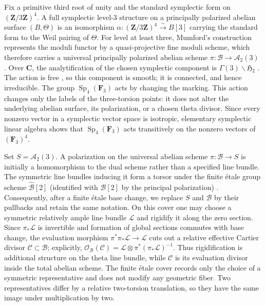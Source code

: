 \documentclass[12pt]{amsart}
\numberwithin{equation}{section}
\theoremstyle{definition}
\theoremstyle{remark}
\newcommand{\C}{\mathbf C}
\newcommand{\Z}{\mathbf Z}
\newcommand{\cO}{\mathcal O}
\begin{document}
Fix a primitive third root of unity and the standard symplectic form on
$(\Z/3\Z)^4$.  A full symplectic level-$3$ structure on a principally
polarized abelian surface $(B,\Theta)$ is an isomorphism
$\alpha:(\Z/3\Z)^4\xrightarrow{\sim}B[3]$ carrying the standard form to
the Weil pairing of $\Theta$.  For level at least three, Mumford's
construction represents the moduli functor by a quasi-projective fine
moduli scheme, which therefore carries a universal principally polarized
abelian scheme $\pi:\mathscr B\to\mathcal A_2(3)$
\cite[Chapter~7, Theorems~7.9--7.10]{MFK}.  Over $\C$, the
analytification of the chosen symplectic component is
$\Gamma(3)\backslash\mathfrak H_2$ \cite[Theorem~8.3.2]{BL}.  The
action is free \cite[Corollary~5.1.10]{BL}, so this component is smooth;
it is connected, and hence irreducible.
The group
$\operatorname{Sp}_4(\mathbf F_3)$ acts by changing the marking.  This
action changes only the labels of the three-torsion points: it does not
alter the underlying abelian surface, its polarization, or a chosen theta
divisor.  Since every nonzero vector in a symplectic vector space is
isotropic, elementary symplectic linear algebra shows that
$\operatorname{Sp}_4(\mathbf F_3)$ acts transitively on the nonzero
vectors of $(\mathbf F_3)^4$.

Set $S=\mathcal A_2(3)$.  A polarization on the universal abelian scheme
$\pi:\mathscr B\to S$ is initially a
homomorphism to the dual scheme rather than a specified line bundle.
The symmetric line bundles inducing it form a torsor under the finite
\'etale group scheme $\widehat{\mathscr B}[2]$ (identified with
$\mathscr B[2]$ by the principal polarization)
\cite[Lemma~4.6.2]{BL}.  Consequently, after a finite \'etale base
change, we replace $S$ and $\mathscr B$ by their pullbacks and retain the
same notation.  On this cover one may choose a symmetric relatively
ample line bundle $\mathscr L$ and rigidify it along the zero section.
Since $\pi_*\mathscr L$ is invertible and formation of global sections
commutes with base change, the evaluation morphism
$\pi^*\pi_*\mathscr L\to\mathscr L$ cuts out a relative effective Cartier
divisor $\mathscr C\subset\mathscr B$; explicitly,
$\cO_{\mathscr B}(\mathscr C)=
\mathscr L\otimes\pi^*(\pi_*\mathscr L)^{-1}$.  Thus rigidification is
additional structure on the theta line bundle, while $\mathscr C$ is its evaluation
divisor inside the total abelian scheme.  The finite \'etale cover records
only the choice of a symmetric representative and does not modify any
geometric fiber.  Two representatives differ by a relative two-torsion
translation, so they have the same image under multiplication by two.
\end{document}
